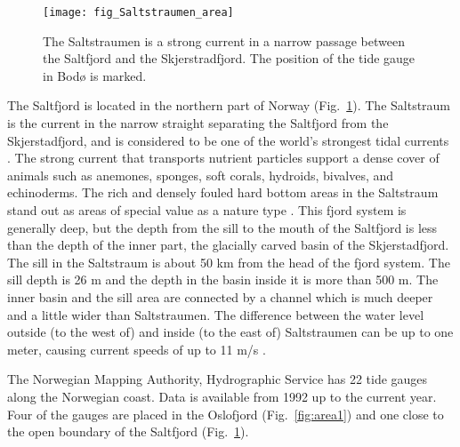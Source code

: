 \begin{figure}[!t]
\centering
\texttt{[image: fig\_Saltstraumen\_area]}
\caption{The Saltstraumen is a strong current in a narrow passage between the Saltfjord and the Skjerstradfjord. The position of the tide gauge in Bod{\o} is marked.}
\label{fig:area2}
\end{figure}

The Saltfjord is located in the northern part of Norway (Fig.~\ref{fig:area2}). The Saltstraum is the current in the narrow straight separating the Saltfjord from the Skjerstadfjord, and is considered to be one of the world's strongest tidal currents \cite[]{gjevik09}. The strong current that transports nutrient particles support a dense cover of animals such as anemones, sponges, soft corals, hydroids, bivalves, and echinoderms. The rich and densely fouled hard bottom areas in the Saltstraum stand out as areas of special value as a nature type \cite[]{fagerli15}. This fjord system is generally deep, but the depth from the sill to the mouth of the Saltfjord is less than the depth of the inner part, the glacially carved basin of the Skjerstadfjord. The sill in the Saltstraum is about 50 km from the head of the fjord system. The sill depth is 26 m and the depth in the basin inside it is more than 500 m. The inner basin and the sill area are connected by a channel which is much deeper and a little wider than Saltstraumen. The difference between the water level outside (to the west of) and inside (to the east of) Saltstraumen can be up to one meter, causing current speeds of up to 11 m/s \cite[]{eliassen01}.

The Norwegian Mapping Authority, Hydrographic Service has 22 tide gauges along the Norwegian coast. Data is available from 1992 up to the current year. Four of the gauges are placed in the Oslofjord  (Fig.~\ref{fig:area1}) and one close to the open boundary of the Saltfjord (Fig.~\ref{fig:area2}).

